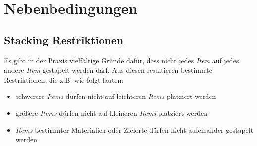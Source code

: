 \section{Nebenbedingungen}
\label{sec:constraints}

\subsection{Stacking Restriktionen}
\label{sec:stacking_restrictions}

Es gibt in der Praxis vielfältige Gründe dafür, dass nicht jedes \textit{Item} auf jedes andere \textit{Item} gestapelt werden darf.
Aus diesen resultieren bestimmte Restriktionen, die z.B. wie folgt lauten:
\begin{itemize}
  \item schwerere \textit{Items} dürfen nicht auf leichteren \textit{Items} platziert werden
  \item größere \textit{Items} dürfen nicht auf kleineren \textit{Items} platziert werden
  \item \textit{Items} bestimmter Materialien oder Zielorte dürfen nicht aufeinander gestapelt werden
\end{itemize}

